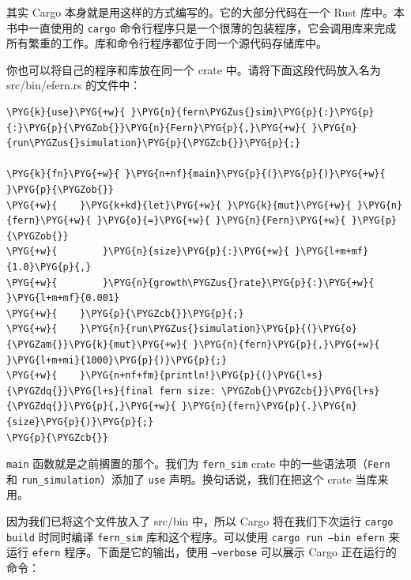 其实 Cargo 本身就是用这样的方式编写的。它的大部分代码在一个 Rust 库中。本书中一直使用的 \texttt{cargo} 命令行程序只是一个很薄的包装程序，它会调用库来完成所有繁重的工作。库和命令行程序都位于同一个源代码存储库中。

你也可以将自己的程序和库放在同一个 crate 中。请将下面这段代码放入名为 src/bin/efern.rs 的文件中：

\begin{Verbatim}[commandchars=\\\{\},breaklines=true,breakanywhere=true,fontsize=\codefont,xleftmargin=17bp]
\PYG{k}{use}\PYG{+w}{ }\PYG{n}{fern\PYGZus{}sim}\PYG{p}{:}\PYG{p}{:}\PYG{p}{\PYGZob{}}\PYG{n}{Fern}\PYG{p}{,}\PYG{+w}{ }\PYG{n}{run\PYGZus{}simulation}\PYG{p}{\PYGZcb{}}\PYG{p}{;}

\PYG{k}{fn}\PYG{+w}{ }\PYG{n+nf}{main}\PYG{p}{(}\PYG{p}{)}\PYG{+w}{ }\PYG{p}{\PYGZob{}}
\PYG{+w}{    }\PYG{k+kd}{let}\PYG{+w}{ }\PYG{k}{mut}\PYG{+w}{ }\PYG{n}{fern}\PYG{+w}{ }\PYG{o}{=}\PYG{+w}{ }\PYG{n}{Fern}\PYG{+w}{ }\PYG{p}{\PYGZob{}}
\PYG{+w}{        }\PYG{n}{size}\PYG{p}{:}\PYG{+w}{ }\PYG{l+m+mf}{1.0}\PYG{p}{,}
\PYG{+w}{        }\PYG{n}{growth\PYGZus{}rate}\PYG{p}{:}\PYG{+w}{ }\PYG{l+m+mf}{0.001}
\PYG{+w}{    }\PYG{p}{\PYGZcb{}}\PYG{p}{;}
\PYG{+w}{    }\PYG{n}{run\PYGZus{}simulation}\PYG{p}{(}\PYG{o}{\PYGZam{}}\PYG{k}{mut}\PYG{+w}{ }\PYG{n}{fern}\PYG{p}{,}\PYG{+w}{ }\PYG{l+m+mi}{1000}\PYG{p}{)}\PYG{p}{;}
\PYG{+w}{    }\PYG{n+nf+fm}{println!}\PYG{p}{(}\PYG{l+s}{\PYGZdq{}}\PYG{l+s}{final fern size: \PYGZob{}\PYGZcb{}}\PYG{l+s}{\PYGZdq{}}\PYG{p}{,}\PYG{+w}{ }\PYG{n}{fern}\PYG{p}{.}\PYG{n}{size}\PYG{p}{)}\PYG{p}{;}
\PYG{p}{\PYGZcb{}}
\end{Verbatim}

\texttt{main} 函数就是之前搁置的那个。我们为 \texttt{fern\_sim} crate 中的一些语法项（\texttt{Fern} 和 \texttt{run\_simulation}）添加了 \texttt{use} 声明。换句话说，我们在把这个 crate 当库来用。

因为我们已将这个文件放入了 src/bin 中，所以 Cargo 将在我们下次运行 \texttt{cargo build} 时同时编译 \texttt{fern\_sim} 库和这个程序。可以使用 \texttt{cargo run --bin efern} 来运行 \texttt{efern} 程序。下面是它的输出，使用 \texttt{--verbose} 可以展示 Cargo 正在运行的命令：

